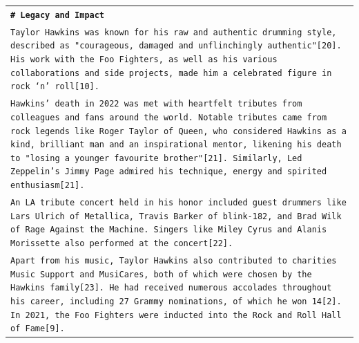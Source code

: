 \documentclass[11pt]{article}
\begin{document}
\begin{longtable}{p{\textwidth}}
\vspace{1pt}
\texttt{\small{\textbf{\# Legacy and Impact}}} \\
\texttt{\small{Taylor Hawkins was known for his raw and authentic drumming style, described as "courageous, damaged and unflinchingly authentic"[20]. His work with the Foo Fighters, as well as his various collaborations and side projects, made him a celebrated figure in rock ‘n’ roll[10].}} \\
\texttt{\small{Hawkins' death in 2022 was met with heartfelt tributes from colleagues and fans around the world. Notable tributes came from rock legends like Roger Taylor of Queen, who considered Hawkins as a kind, brilliant man and an inspirational mentor, likening his death to "losing a younger favourite brother"[21]. Similarly, Led Zeppelin’s Jimmy Page admired his technique, energy and spirited enthusiasm[21].}} \\
\texttt{\small{An LA tribute concert held in his honor included guest drummers like Lars Ulrich of Metallica, Travis Barker of blink-182, and Brad Wilk of Rage Against the Machine. Singers like Miley Cyrus and Alanis Morissette also performed at the concert[22].}} \\
\texttt{\small{Apart from his music, Taylor Hawkins also contributed to charities Music Support and MusiCares, both of which were chosen by the Hawkins family[23]. He had received numerous accolades throughout his career, including 27 Grammy nominations, of which he won 14[2]. In 2021, the Foo Fighters were inducted into the Rock and Roll Hall of Fame[9].}} \\


\end{longtable}
\end{document}
